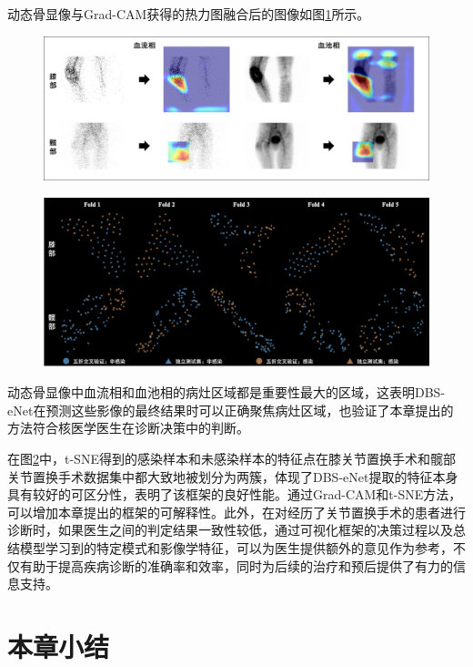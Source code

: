 动态骨显像与Grad-CAM获得的热力图融合后的图像如图\ref{fig:chap03_Grad-CAM}所示。
\begin{figure}[htbp]
  \centering
  \includegraphics[width=\textwidth]{figures/chap03_Grad-CAM.jpg}
  \label{fig:chap03_Grad-CAM}
\end{figure}
\begin{figure}[htbp]
  \centering
  \includegraphics[width=\textwidth]{figures/chap03_t-SNE.jpg}
  \label{fig:chap03_t-SNE}
\end{figure}
动态骨显像中血流相和血池相的病灶区域都是重要性最大的区域，这表明DBS-eNet在预测这些影像的最终结果时可以正确聚焦病灶区域，也验证了本章提出的方法符合核医学医生在诊断决策中的判断。

在图\ref{fig:chap03_t-SNE}中，t-SNE得到的感染样本和未感染样本的特征点在膝关节置换手术和髋部关节置换手术数据集中都大致地被划分为两簇，体现了DBS-eNet提取的特征本身具有较好的可区分性，表明了该框架的良好性能。通过Grad-CAM和t-SNE方法，可以增加本章提出的框架的可解释性。此外，在对经历了关节置换手术的患者进行诊断时，如果医生之间的判定结果一致性较低，通过可视化框架的决策过程以及总结模型学习到的特定模式和影像学特征，可以为医生提供额外的意见作为参考，不仅有助于提高疾病诊断的准确率和效率，同时为后续的治疗和预后提供了有力的信息支持。

\section{本章小结}

